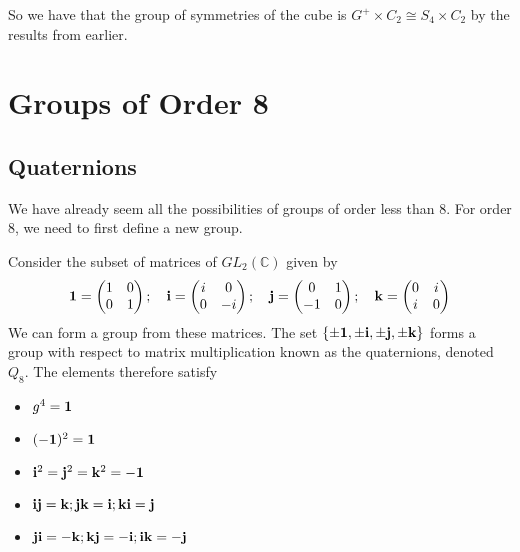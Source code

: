 \documentclass{article}
\begin{document}
So we have that the group of symmetries of the cube is $G^+ \times C_2 \cong S_4 \times C_2$ by the results from earlier.

\section{Groups of Order 8}
\subsection{Quaternions}
We have already seem all the possibilities of groups of order less than 8. For order 8, we need to first define a new group.
\begin{definition}
	Consider the subset of matrices of $GL_2(\mathbb C)$ given by
	\[ \vb 1 = \begin{pmatrix}
			1 & 0 \\ 0 & 1
		\end{pmatrix};\quad \vb i = \begin{pmatrix}
			i & 0 \\ 0 & -i
		\end{pmatrix};\quad \vb j = \begin{pmatrix}
			0 & 1 \\ -1 & 0
		\end{pmatrix};\quad \vb k = \begin{pmatrix}
			0 & i \\ i & 0
		\end{pmatrix} \]
	We can form a group from these matrices. The set $\{ \pm \vb 1, \pm \vb i, \pm \vb j, \pm \vb k \}$ forms a group with respect to matrix multiplication known as the quaternions, denoted $Q_8$. The elements therefore satisfy
	\begin{itemize}
		\item $g^4 = \vb 1$
		\item $(-\vb 1)^2 = \vb 1$
		\item $\vb i^2 = \vb j^2 = \vb k^2 = -\vb 1$
		\item $\vb i \vb j = \vb k; \vb j \vb k = \vb i; \vb k \vb i = \vb j$
		\item $\vb j \vb i = -\vb k; \vb k \vb j = -\vb i; \vb i \vb k = -\vb j$
	\end{itemize}
\end{definition}
\end{document}
